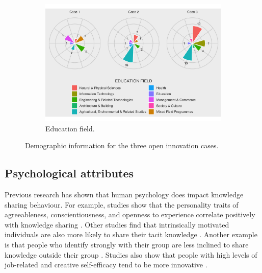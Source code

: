 \begin{figure}[hbt!]
\begin{subfigure}[b]{0.7\textwidth}
\includegraphics[width=1\linewidth]{Images/ed_field.png}
\caption{Education field.}
\end{subfigure}

\caption[Demographic information for each case]{Demographic information for the three open innovation cases.}
\label{fig:demographics}
\end{figure}


\subsection{Psychological attributes}

Previous research has shown that human psychology does impact knowledge sharing behaviour. For example, studies show that the personality traits of agreeableness, conscientiousness, and openness to experience correlate positively with knowledge sharing \citep{matzler2011personality,borges2012tacit}. Other studies find that intrinsically motivated individuals are also more likely to share their tacit knowledge \citep{hung2011influence,llopis2016understanding}. Another example is that people who identify strongly with their group are less inclined to share knowledge outside their group \citep{kane2005knowledge,argote2009superordinate,dokko2014one}. Studies also show that people with high levels of job-related and creative self-efficacy tend to be more innovative \citep{farmer2006developing, leonard2014knowledge}. \medskip

